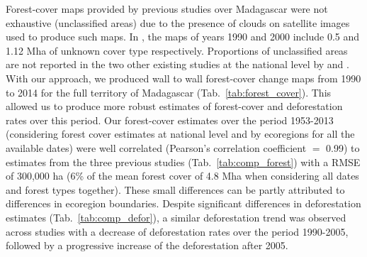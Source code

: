 \documentclass[essd, classical]{copernicus}
\begin{document}
Forest-cover maps provided by previous studies over Madagascar were
not exhaustive (unclassified areas) due to the presence of clouds on
satellite images used to produce such maps. In \citet{Harper2007}, the
maps of years 1990 and 2000 include 0.5 and 1.12 Mha of unknown cover
type respectively. Proportions of unclassified areas are not reported
in the two other existing studies at the national level by
\citet{MEFT2009} and \citet{ONE2015}. With our approach, we produced
wall to wall forest-cover change maps from 1990 to 2014 for the full
territory of Madagascar (Tab.~\ref{tab:forest_cover}). This allowed us
to produce more robust estimates of forest-cover and deforestation
rates over this period. Our forest-cover estimates over the period
1953-2013 (considering forest cover estimates at national level and by
ecoregions for all the available dates) were well correlated
(Pearson's correlation coefficient $=$ 0.99) to estimates from the
three previous studies (Tab.~\ref{tab:comp_forest}) with a RMSE of
300,000 ha (6\% of the mean forest cover of 4.8 Mha when considering
all dates and forest types together). These small differences can be
partly attributed to differences in ecoregion boundaries. Despite
significant differences in deforestation estimates
(Tab.~\ref{tab:comp_defor}), a similar deforestation trend was
observed across studies with a decrease of deforestation rates over
the period 1990-2005, followed by a progressive increase of the
deforestation after 2005.
\end{document}
